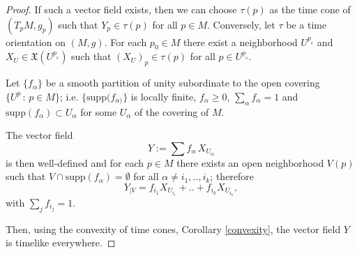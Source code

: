 \begin{proof}
    If such a vector field exists, then we can choose $\tau(p)$ as the time cone of $(T_pM,g_p)$ such that $Y_p\in \tau(p)$ for all $p\in M$. Conversely, let $\tau$ be a time orientation on $(M,g)$. For each $p_0 \in M$ there exist a neighborhood $U^{p_{_0}}$ and $X_U\in \mathfrak{X}(U^{p_{_0}})$ such that $(X_U)_p \in \tau(p)$ for all $p\in U^{p_{_0}}$.

    Let $\{f_{\alpha}\}$ be a smooth partition of unity subordinate to the open covering $\{U^p\, : \, p\in M\}$; i.e. $\{\mathrm{supp}(f_{\alpha)}\}$ is locally finite, $f_{\alpha}\geq 0$, $\sum_{\alpha} f_{\alpha}=1$ and $\mathrm{supp}(f_{\alpha}) \subset U_{\alpha}$ for some $U_{\alpha}$ of the covering of $M$.

    The vector field $$Y:=\sum f_{\alpha}\, X_{U_{\alpha}}$$ is then well-defined and for each $p\in M$ there exists an open neighborhood $V(p)$ such that $V \cap \mathrm{supp}(f_{\alpha}) = \emptyset$ for all $\alpha \neq i_1,..,i_k$; therefore
    \[
        Y_{\mid V}=f_{i_1}X_{U_{i_1}}+..+f_{i_k}X_{U_{i_k}},
    \]
    with $\sum_j f_{i_j}=1$.

    Then, using the convexity of time cones, Corollary \ref{convexity}, the vector field $Y$ is timelike everywhere.
\end{proof}



